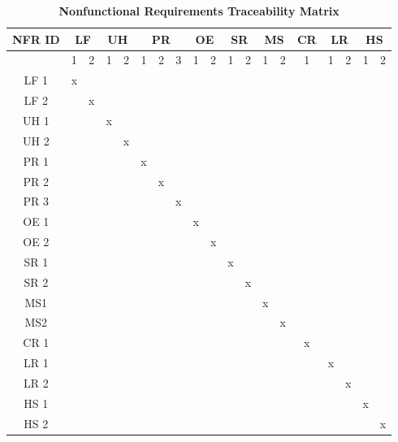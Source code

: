\documentclass[12pt, titlepage]{article}
\begin{document}
\begin{enumerate}
\begin{enumerate}
\begin{enumerate}
\begin{landscape}
  \begin{table}[H]
    \centering
    \begin{tabular}{|c|cc|cc|ccc|cc|cc|cc|c|cc|cc|}
      \hline
      \multicolumn{1}{|c|}{\textbf{NFR ID}} & \multicolumn{2}{c|}{\textbf{LF}} & \multicolumn{2}{c|}{\textbf{UH}} & \multicolumn{3}{c|}{\textbf{PR}} & \multicolumn{2}{c|}{\textbf{OE}} & \multicolumn{2}{c|}{\textbf{SR}} & \multicolumn{2}{c|}{\textbf{MS}} & \textbf{CR} & \multicolumn{2}{c|}{\textbf{LR}} & \multicolumn{2}{c|}{\textbf{HS}} \\ 
      \hline
      & 1 & 2 & 1 & 2 & 1 & 2 & 3 & 1 & 2 & 1 & 2 & 1 & 2 & 1 & 1 & 2 & 1 & 2 \\ 
      \hline
      LF 1 & x &  &  &  &  &  &  &  &  &  &  &  &  &  &  &  &  &  \\ 
      \hline
      LF 2 &  & x &  &  &  &  &  &  &  &  &  &  &  &  &  &  &  &  \\ 
      \hline
      UH 1 &  &  & x &  &  &  &  &  &  &  &  &  &  &  &  &  &  &  \\ 
      \hline
      UH 2 &  &  &  & x &  &  &  &  &  &  &  &  &  &  &  &  &  &  \\ 
      \hline
      PR 1 &  &  &  &  & x &  &  &  &  &  &  &  &  &  &  &  &  &  \\ 
      \hline
      PR 2 &  &  &  &  &  & x &  &  &  &  &  &  &  &  &  &  &  &  \\ 
      \hline
      PR 3 &  &  &  &  &  &  & x &  &  &  &  &  &  &  &  &  &  &  \\ 
      \hline
      OE 1 &  &  &  &  &  &  &  & x &  &  &  &  &  &  &  &  &  &  \\ 
      \hline
      OE 2 &  &  &  &  &  &  &  &  & x &  &  &  &  &  &  &  &  &  \\ 
      \hline
      SR 1 &  &  &  &  &  &  &  &  &  & x &  &  &  &  &  &  &  &  \\ 
      \hline
      SR 2 &  &  &  &  &  &  &  &  &  &  & x &  &  &  &  &  &  &  \\ 
      \hline
      MS1  &  &  &  &  &  &  &  &  &  &  &  & x &  &  &  &  &  &  \\ 
      \hline
      MS2  &  &  &  &  &  &  &  &  &  &  &  &  & x &  &  &  &  &  \\ 
      \hline
      CR 1 &  &  &  &  &  &  &  &  &  &  &  &  &  & x &  &  &  &  \\ 
      \hline
      LR 1 &  &  &  &  &  &  &  &  &  &  &  &  &  &  & x &  &  &  \\ 
      \hline
      LR 2 &  &  &  &  &  &  &  &  &  &  &  &  &  &  &  & x &  &  \\ 
      \hline
      HS 1 &  &  &  &  &  &  &  &  &  &  &  &  &  &  &  &  & x &  \\ 
      \hline
      HS 2 &  &  &  &  &  &  &  &  &  &  &  &  &  &  &  &  &  & x \\ 
      \hline
    \end{tabular}
    \caption{\textbf{Nonfunctional Requirements Traceability Matrix}}
    \label{tab:nf_requirements}
  \end{table}  
  \end{landscape}
  

\end{enumerate}
\end{enumerate}
\end{enumerate}
\end{document}
